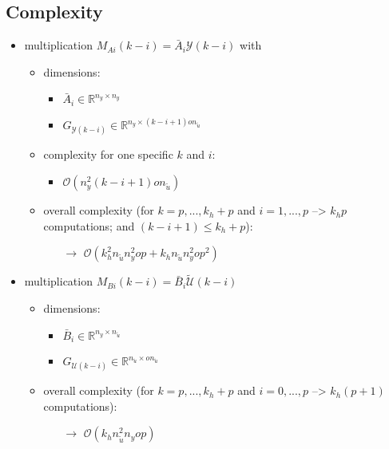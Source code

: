 \documentclass{article}
\begin{document}
\subsection{Complexity}
\begin{itemize}
    \item multiplication $M_{Ai}(k-i) = \bar{A}_{i} \mathcal{Y}(k-i)$ with 
    \begin{itemize}
        \item dimensions:
        \begin{itemize}
            \item $\bar{A}_{i}\in \mathbb{R}^{n_y \times n_y}$
            \item $G_{\mathcal{Y}(k-i)} \in \mathbb{R}^{n_y \times (k-i+1)o n_{\tilde{u}}}$
        \end{itemize}
        \item complexity for one specific $k$ and $i$:
        \begin{itemize}
            \item $\mathcal{O}(n_y^2 (k-i+1)o n_{\tilde{u}})$
        \end{itemize}
        \item overall complexity (for $k=p,...,k_h+p$ and $i=1,...,p$ --> $k_h p$ computations; and $(k-i+1)\leq k_h+p$):
        \begin{itemize}
            \item[$\rightarrow$] $\mathcal{O}(k_h^2 n_{\tilde{u}} n_y^2 o p + k_h n_{\tilde{u}} n_y^2 o p^2)$
        \end{itemize}
    \end{itemize}
    \item multiplication $M_{Bi}(k-i) = \bar{B}_{i} \tilde{\mathcal{U}}(k-i)$
    \begin{itemize}
        \item dimensions:
        \begin{itemize}
            \item $\bar{B}_{i}\in \mathbb{R}^{n_y \times n_{\tilde{u}}}$
            \item $G_{\mathcal{U}(k-i)} \in \mathbb{R}^{n_{\tilde{u}} \times o n_{\tilde{u}}}$
        \end{itemize}
        \item overall complexity (for $k=p,...,k_h+p$ and $i=0,...,p$ --> $k_h (p+1)$ computations):
        \begin{itemize}
            \item[$\rightarrow$] $\mathcal{O}(k_h n_{\tilde{u}}^2 n_y o p)$

\end{itemize}
\end{itemize}
\end{itemize}
\end{document}

